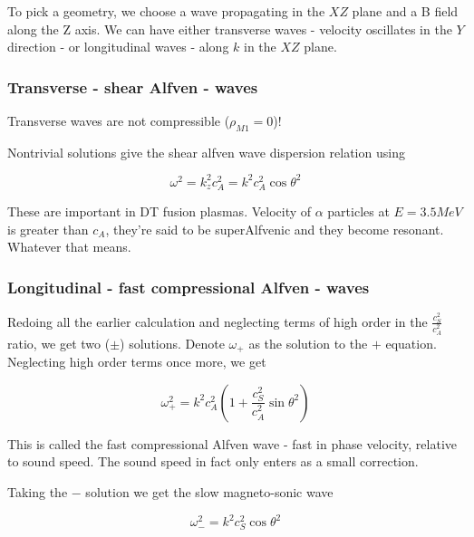 \documentclass[PlasmaNotes.tex]{subfiles}
\begin{document}
To pick a geometry, we choose a wave propagating in the $XZ$ plane and a B field along the Z axis. We can have either transverse waves - velocity oscillates in the $Y$ direction - or longitudinal waves - along $k$ in the $XZ$ plane.

\subsubsection{Transverse - shear Alfven - waves}

Transverse waves are not compressible ($\rho_{M1} =0$)!

Nontrivial solutions give the shear alfven wave dispersion relation using 

\[ \omega^2 = k_z^2 c_A^2 = k^2 c_A^2 \cos{\theta}^2 \]

These are important in DT fusion plasmas. Velocity of $\alpha$ particles at $E=3.5 MeV$ is greater than $c_A$, they're said to be superAlfvenic and they become resonant. Whatever that means.

\subsubsection{Longitudinal - fast compressional Alfven - waves}

Redoing all the earlier calculation and neglecting terms of high order in the $\frac{c_S^2}{c_A^2}$ ratio, we get two ($\pm$) solutions. Denote $\omega_+$ as the solution to the $+$ equation. Neglecting high order terms once more, we get

\[ \omega_+^2 = k^2 c_A^2 (1+\frac{c_S^2}{c_A^2} \sin{\theta}^2) \]

This is called the fast compressional Alfven wave - fast in phase velocity, relative to sound speed. The sound speed in fact only enters as a small correction.

Taking the $-$ solution we get the slow magneto-sonic wave

\[ \omega_-^2 = k^2 c_S^2 \cos{\theta}^2 \]
\end{document}
